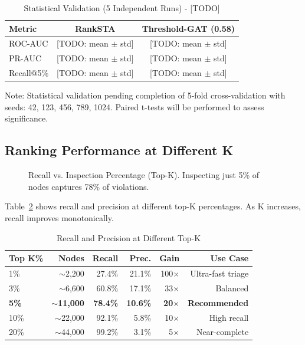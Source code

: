 \documentclass[10pt,twocolumn,journal]{IEEEtran}
\begin{document}
\begin{table}[h]
\centering
\caption{Statistical Validation (5 Independent Runs) - [TODO]}
\label{tab:statistical}
\begin{tabular}{@{}lcc@{}}
\toprule
\textbf{Metric} & \textbf{RankSTA} & \textbf{Threshold-GAT (0.58)} \\
\midrule
ROC-AUC & [TODO: mean $\pm$ std] & [TODO: mean $\pm$ std] \\
PR-AUC & [TODO: mean $\pm$ std] & [TODO: mean $\pm$ std] \\
Recall@5\% & [TODO: mean $\pm$ std] & [TODO: mean $\pm$ std] \\
\bottomrule
\end{tabular}
\vspace{-2mm}
\footnotesize{Note: Statistical validation pending completion of 5-fold cross-validation with seeds: 42, 123, 456, 789, 1024. Paired t-tests will be performed to assess significance.}
\end{table}

\subsection{Ranking Performance at Different K}

\begin{figure}[t]
\centering
{}
\caption{Recall vs. Inspection Percentage (Top-K). Inspecting just 5\% of nodes captures 78\% of violations.}
\label{fig:recall_k}
\end{figure}

Table~\ref{tab:recall_k} shows recall and precision at different top-K percentages. As K increases, recall improves monotonically.

\begin{table}[t]
\centering
\caption{Recall and Precision at Different Top-K}
\label{tab:recall_k}
\begin{tabular}{@{}lrrrrr@{}}
\toprule
\textbf{Top K\%} & \textbf{Nodes} & \textbf{Recall} & \textbf{Prec.} & \textbf{Gain} & \textbf{Use Case} \\
\midrule
1\% & $\sim$2,200 & 27.4\% & 21.1\% & 100$\times$ & Ultra-fast triage \\
3\% & $\sim$6,600 & 60.8\% & 17.1\% & 33$\times$ & Balanced \\
\textbf{5\%} & \textbf{$\sim$11,000} & \textbf{78.4\%} & \textbf{10.6\%} & \textbf{20$\times$} & \textbf{Recommended} \\
10\% & $\sim$22,000 & 92.1\% & 5.8\% & 10$\times$ & High recall \\
20\% & $\sim$44,000 & 99.2\% & 3.1\% & 5$\times$ & Near-complete \\
\bottomrule
\end{tabular}
\end{table}
\end{document}
